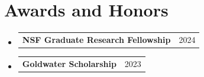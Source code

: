 \documentclass[letterpaper,11pt]{article}
\makeatletter
\newcommand{\resumeProjectHeading}[2]{
    \item
    \begin{tabular*}{0.97\textwidth}{l@{\extracolsep{\fill}}r}
      \small#1 & #2 \\
    \end{tabular*}\vspace{-7pt}
}
\newcommand{\resumeSubHeadingListStart}{\begin{itemize}[leftmargin=0.15in, label={}]}
\newcommand{\resumeSubHeadingListEnd}{\end{itemize}}
\makeatother
\begin{document}
\section{Awards and Honors}
 \resumeSubHeadingListStart
        \resumeProjectHeading{\textbf{NSF Graduate Research Fellowship}}{2024}
        \resumeProjectHeading{\textbf{Goldwater Scholarship}}{2023}
        

 \resumeSubHeadingListEnd

    
     
     
     
     
\end{document}
